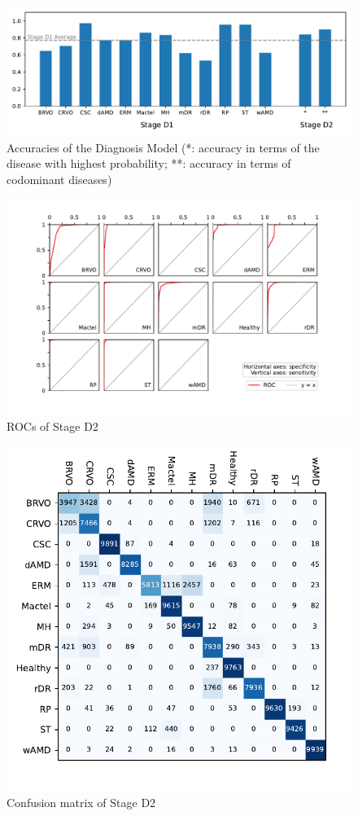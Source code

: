 \documentclass{article}
\begin{document}
	\begin{figure}[htbp]
		\centering
		\includegraphics[width=\linewidth]{Figs/diagnosis1_acc_barchart.pdf}
		\caption{Accuracies of the Diagnosis Model (*: accuracy in terms of the disease with highest probability; **: accuracy in terms of codominant diseases)}
		\vspace{0.3cm}
		\label{fig:D1_acc_bar}
	\end{figure}
	
	\begin{figure}[htbp]
		\centering
		\includegraphics[width=\linewidth]{Figs/diagnosis2_ROC.pdf}
		\caption{ROCs of Stage D2}
		\vspace{0.3cm}
		\label{fig:D2_ROC}
	\end{figure}
	
	\begin{figure}[H]
		\centering
		\includegraphics[width=0.7\linewidth]{Figs/diagnosis2_confusion_matrix.pdf}
		\vspace{-0.8cm}
		\caption{Confusion matrix of Stage D2}
		\label{fig:D2_conf_mat}
	\end{figure}
	
\end{document}
